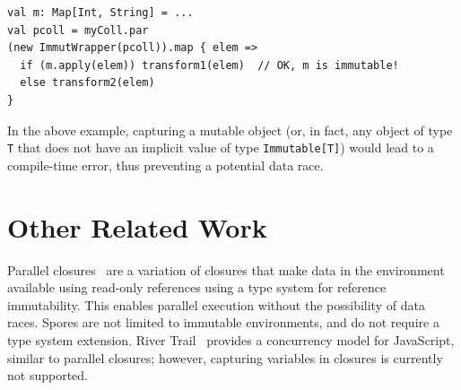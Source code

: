 \documentclass[runningheads]{llncs}
\begin{document}
\begin{sloppypar}
{\begin{lstlisting}
val m: Map[Int, String] = ...
val pcoll = myColl.par
(new ImmutWrapper(pcoll)).map { elem =>
  if (m.apply(elem)) transform1(elem)  // OK, m is immutable!
  else transform2(elem)
}
\end{lstlisting}
\noindent
In the above example, capturing a mutable object (or, in fact, any object of type \verb|T| that does not have an implicit value of type \verb|Immutable[T]|) would lead to a compile-time error, thus preventing a potential data race.
}





\section{Other Related Work}
\label{sec:related-work}

Parallel closures~\cite{ParallelClosures} are a variation of closures that
make data in the environment available using read-only references using a type
system for reference immutability. This enables parallel execution without the
possibility of data races. Spores are not limited to immutable environments,
and do not require a type system extension. River Trail~\cite{HerhutHSS13}
provides a concurrency model for JavaScript, similar to parallel closures;
however, capturing variables in closures is currently not supported.


\end{sloppypar}
\end{document}
